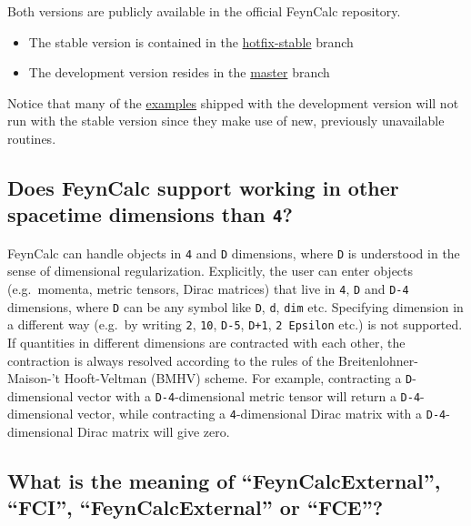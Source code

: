 \documentclass[../FeynCalcManual.tex]{subfiles}
\begin{document}
Both versions are publicly available in the official FeynCalc
repository.

\begin{itemize}
\tightlist
\item
  The stable version is contained in the
  \href{https://github.com/FeynCalc/feyncalc/tree/hotfix-stable}{hotfix-stable}
  branch
\item
  The development version resides in the
  \href{https://github.com/FeynCalc/feyncalc/tree/master}{master} branch
\end{itemize}

Notice that many of the
\href{https://github.com/FeynCalc/feyncalc/tree/master/FeynCalc/Examples}{examples}
shipped with the development version will not run with the stable
version since they make use of new, previously unavailable routines.

\subsection{\texorpdfstring{Does FeynCalc support working in other
spacetime dimensions than
\texttt{4}?}{Does FeynCalc support working in other spacetime dimensions than ?}}\label{does-feyncalc-support-working-in-other-spacetime-dimensions-than-4}

FeynCalc can handle objects in \texttt{4} and \texttt{D} dimensions,
where \texttt{D} is understood in the sense of dimensional
regularization. Explicitly, the user can enter objects (e.g.~momenta,
metric tensors, Dirac matrices) that live in \texttt{4}, \texttt{D} and
\texttt{D-4} dimensions, where \texttt{D} can be any symbol like
\texttt{D}, \texttt{d}, \texttt{dim} etc. Specifying dimension in a
different way (e.g.~by writing \texttt{2}, \texttt{10}, \texttt{D-5},
\texttt{D+1}, \texttt{2 Epsilon} etc.) is not supported. If quantities
in different dimensions are contracted with each other, the contraction
is always resolved according to the rules of the Breitenlohner-Maison-'t
Hooft-Veltman (BMHV) scheme. For example, contracting a
\texttt{D}-dimensional vector with a \texttt{D-4}-dimensional metric
tensor will return a \texttt{D-4}-dimensional vector, while contracting
a \texttt{4}-dimensional Dirac matrix with a \texttt{D-4}-dimensional
Dirac matrix will give zero.

\subsection{What is the meaning of ``FeynCalcExternal'', ``FCI'',
``FeynCalcExternal'' or
``FCE''?}\label{what-is-the-meaning-of-feyncalcexternal-fci-feyncalcexternal-or-fce}
\end{document}
